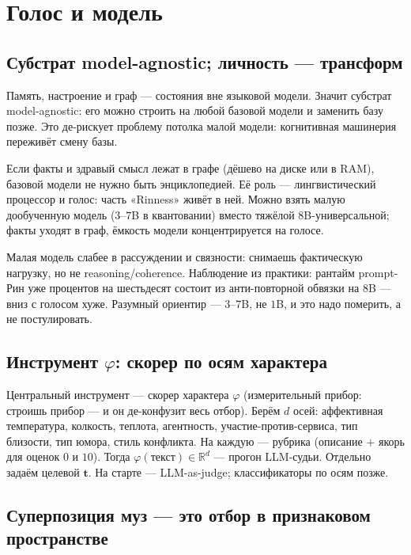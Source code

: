 \chapter{Голос и модель}
\label{ch:voice}

\section{Субстрат model-agnostic; личность — трансформ}

Память, настроение и граф — состояния вне языковой модели. Значит субстрат
model-agnostic: его можно строить на любой базовой модели и заменить базу позже.
Это де-рискует проблему потолка малой модели: когнитивная машинерия переживёт смену
базы.

Если факты и здравый смысл лежат в графе (дёшево на диске или в RAM), базовой модели
не нужно быть энциклопедией. Её роль — лингвистический процессор и голос: часть
«Rinness» живёт в ней. Можно взять малую дообученную модель ($3$--$7$B в квантовании)
вместо тяжёлой $8$B-универсальной; факты уходят в граф, ёмкость модели
концентрируется на голосе.

\begin{pitfall}
Малая модель слабее в рассуждении и связности: снимаешь фактическую нагрузку, но не
reasoning/coherence. Наблюдение из практики: рантайм prompt-Рин уже процентов на
шестьдесят состоит из анти-повторной обвязки на $8$B — вниз с голосом хуже.
Разумный ориентир — $3$--$7$B, не $1$B, и это надо померить, а не постулировать.
\end{pitfall}

\section{Инструмент $\varphi$: скорер по осям характера}

Центральный инструмент — скорер характера $\varphi$ (измерительный прибор: строишь
прибор — и он де-конфузит весь отбор). Берём $d$ осей: аффективная температура,
колкость, теплота, агентность, участие-против-сервиса, тип близости, тип юмора,
стиль конфликта. На каждую — рубрика (описание $+$ якорь для оценок $0$ и $10$).
Тогда $\varphi(\text{текст})\in\mathbb{R}^d$ — прогон LLM-судьи. Отдельно задаём
целевой $\mathbf{t}$. На старте — LLM-as-judge; классификаторы по осям позже.

\section{Суперпозиция муз — это отбор в признаковом пространстве}

